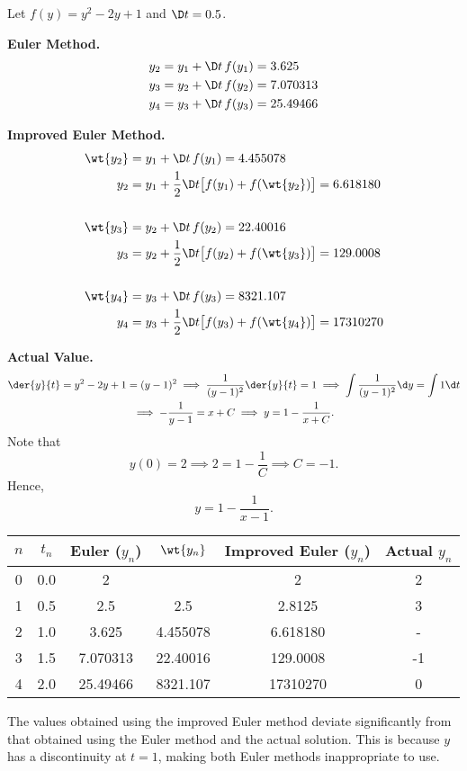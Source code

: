 \begin{solution}
    Let $f(y) = y^2 - 2y + 1$ and $\D t = 0.5$.

    \textbf{Euler Method.}
    \begin{align*}
        y_2 &= y_1 + \D t \, f(y_1) = 3.625\\
        y_3 &= y_2 + \D t \, f(y_2) = 7.070313\\
        y_4 &= y_3 + \D t \, f(y_3) = 25.49466
    \end{align*}

    \textbf{Improved Euler Method.}
    \begin{align*}
        \wt{y_2} &= y_1 + \D t \, f(y_1) = 4.455078\\
        y_2 &= y_1 + \frac12 \D t \big[f(y_1) + f(\wt{y_2})\big] = 6.618180\\\\
        \wt{y_3} &= y_2 + \D t \, f(y_2) = 22.40016\\
        y_3 &= y_2 + \frac12 \D t \big[f(y_2) + f(\wt{y_3})\big] = 129.0008\\\\
        \wt{y_4} &= y_3 + \D t \, f(y_3) = 8321.107\\
        y_4 &= y_3 + \frac12 \D t \big[f(y_3) + f(\wt{y_4})\big] = 17310270
    \end{align*}

    \textbf{Actual Value.}
    \begin{gather*}
        \der{y}{t} = y^2 - 2y + 1 = (y-1)^2 \implies \frac1{(y-1)^2} \der{y}{t} = 1 \implies \int \frac1{(y-1)^2} \d y = \int 1 \d t\\
        \implies -\frac{1}{y-1} = x + C \implies y = 1 - \frac{1}{x+C}.
    \end{gather*}
    Note that \[y(0) = 2 \implies 2 = 1 - \frac1C \implies C = -1.\] Hence, \[y = 1 - \frac1{x-1}.\]

    \begin{table}[H]
        \centering
        \begin{tabular}{|c|c|c|c|c|c|}
        \hline
        $n$ & $t_n$ & Euler ($y_n$) & $\wt{y_n}$ & Improved Euler ($y_n$) & Actual $y_n$ \\ \hline\hline
        0 & 0.0 & 2 & \cellcolor{black!10} & 2 & 2 \\ \hline
        1 & 0.5 & 2.5 & 2.5 & 2.8125 & 3 \\ \hline
        2 & 1.0 & 3.625 & 4.455078 & 6.618180 & - \\ \hline
        3 & 1.5 & 7.070313 & 22.40016 & 129.0008 & -1 \\ \hline
        4 & 2.0 & 25.49466 & 8321.107 & 17310270 & 0 \\ \hline
        \end{tabular}
    \end{table}

    The values obtained using the improved Euler method deviate significantly from that obtained using the Euler method and the actual solution. This is because $y$ has a discontinuity at $t = 1$, making both Euler methods inappropriate to use.
\end{solution}

